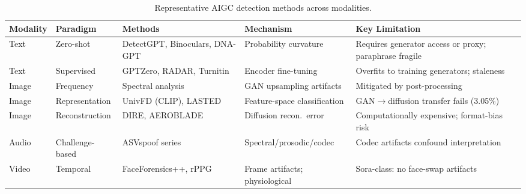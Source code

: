 
\begin{table}[htbp]
\centering
\caption{Representative AIGC detection methods across modalities.}
\label{tab:detection}
\scriptsize
\setlength{\tabcolsep}{4pt}
\renewcommand{\arraystretch}{0.92}
\begin{tabularx}{\textwidth}{l l l l X}
\toprule
\textbf{Modality} & \textbf{Paradigm} & \textbf{Methods} & \textbf{Mechanism} & \textbf{Key Limitation} \\
\midrule
Text & Zero-shot & DetectGPT, Binoculars, DNA-GPT & Probability curvature & Requires generator access or proxy; paraphrase fragile \\
Text & Supervised & GPTZero, RADAR, Turnitin & Encoder fine-tuning & Overfits to training generators; staleness \\
Image & Frequency & Spectral analysis & GAN upsampling artifacts & Mitigated by post-processing \\
Image & Representation & UnivFD (CLIP), LASTED & Feature-space classification & GAN$\to$diffusion transfer fails (3.05\%) \\
Image & Reconstruction & DIRE, AEROBLADE & Diffusion recon.\ error & Computationally expensive; format-bias risk \\
Audio & Challenge-based & ASVspoof series & Spectral/prosodic/codec & Codec artifacts confound interpretation \\
Video & Temporal & FaceForensics++, rPPG & Frame artifacts; physiological & Sora-class: no face-swap artifacts \\
\bottomrule
\end{tabularx}
\end{table}
